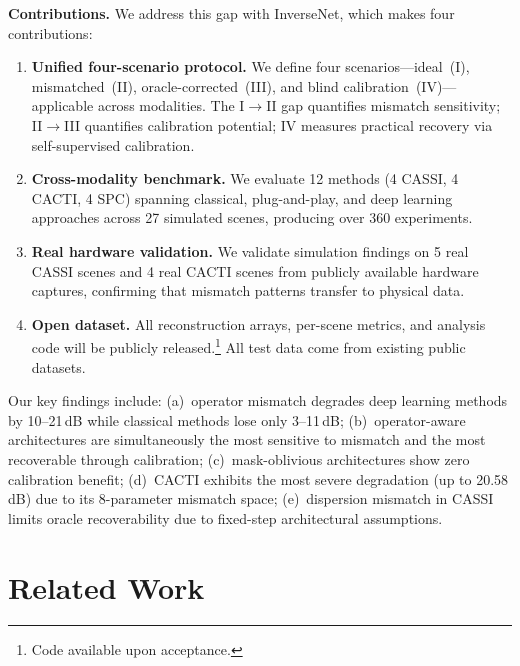 \documentclass[runningheads]{llncs}
\begin{document}
\textbf{Contributions.}
We address this gap with InverseNet, which makes four contributions:
\begin{enumerate}
    \item \textbf{Unified four-scenario protocol.} We define four scenarios---ideal~(I), mismatched~(II), oracle-corrected~(III), and blind calibration~(IV)---applicable across modalities. The I$\to$II gap quantifies mismatch sensitivity; II$\to$III quantifies calibration potential; IV measures practical recovery via self-supervised calibration.

    \item \textbf{Cross-modality benchmark.} We evaluate 12 methods (4 CASSI, 4 CACTI, 4 SPC) spanning classical, plug-and-play, and deep learning approaches across 27 simulated scenes, producing over 360 experiments.

    \item \textbf{Real hardware validation.} We validate simulation findings on 5 real CASSI scenes and 4 real CACTI scenes from publicly available hardware captures, confirming that mismatch patterns transfer to physical data.

    \item \textbf{Open dataset.} All reconstruction arrays, per-scene metrics, and analysis code will be publicly released.\footnote{Code available upon acceptance.} All test data come from existing public datasets.
\end{enumerate}

Our key findings include: (a)~operator mismatch degrades deep learning methods by 10--21\,dB while classical methods lose only 3--11\,dB; (b)~operator-aware architectures are simultaneously the most sensitive to mismatch and the most recoverable through calibration; (c)~mask-oblivious architectures show zero calibration benefit; (d)~CACTI exhibits the most severe degradation (up to 20.58\,dB) due to its 8-parameter mismatch space; (e)~dispersion mismatch in CASSI limits oracle recoverability due to fixed-step architectural assumptions.

\section{Related Work}
\label{sec:related}
\end{document}
